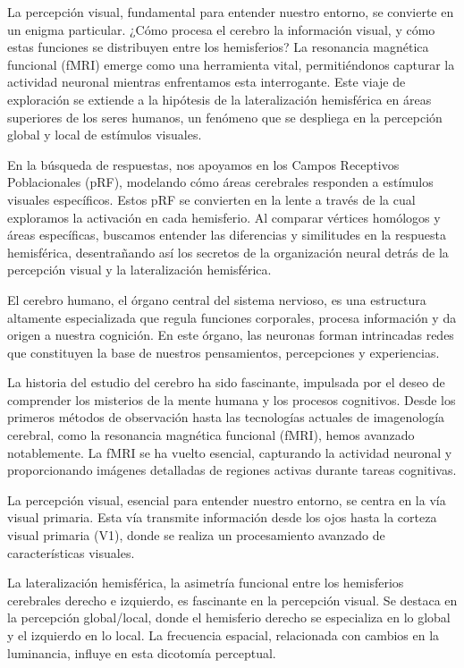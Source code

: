 \documentclass[12pt,oneside]{uhthesis}
\begin{document}
La percepción visual, fundamental para entender nuestro entorno, se convierte en un enigma particular. ¿Cómo procesa el cerebro la información visual, y cómo estas funciones se distribuyen entre los hemisferios? La resonancia magnética funcional (fMRI) emerge como una herramienta vital, permitiéndonos capturar la actividad neuronal mientras enfrentamos esta interrogante. Este viaje de exploración se extiende a la hipótesis de la lateralización hemisférica en áreas superiores de los seres humanos, un fenómeno que se despliega en la percepción global y local de estímulos visuales.

En la búsqueda de respuestas, nos apoyamos en los Campos Receptivos Poblacionales (pRF), modelando cómo áreas cerebrales responden a estímulos visuales específicos. Estos pRF se convierten en la lente a través de la cual exploramos la activación en cada hemisferio. Al comparar vértices homólogos y áreas específicas, buscamos entender las diferencias y similitudes en la respuesta hemisférica, desentrañando así los secretos de la organización neural detrás de la percepción visual y la lateralización hemisférica.

\newpage

El cerebro humano, el órgano central del sistema nervioso, es una estructura altamente especializada que regula funciones corporales, procesa información y da origen a nuestra cognición. En este órgano, las neuronas forman intrincadas redes que constituyen la base de nuestros pensamientos, percepciones y experiencias.

La historia del estudio del cerebro ha sido fascinante, impulsada por el deseo de comprender los misterios de la mente humana y los procesos cognitivos. Desde los primeros métodos de observación hasta las tecnologías actuales de imagenología cerebral, como la resonancia magnética funcional (fMRI), hemos avanzado notablemente. La fMRI se ha vuelto esencial, capturando la actividad neuronal y proporcionando imágenes detalladas de regiones activas durante tareas cognitivas.

La percepción visual, esencial para entender nuestro entorno, se centra en la vía visual primaria. Esta vía transmite información desde los ojos hasta la corteza visual primaria (V1), donde se realiza un procesamiento avanzado de características visuales.

La lateralización hemisférica, la asimetría funcional entre los hemisferios cerebrales derecho e izquierdo, es fascinante en la percepción visual. Se destaca en la percepción global/local, donde el hemisferio derecho se especializa en lo global y el izquierdo en lo local. La frecuencia espacial, relacionada con cambios en la luminancia, influye en esta dicotomía perceptual.
\end{document}
